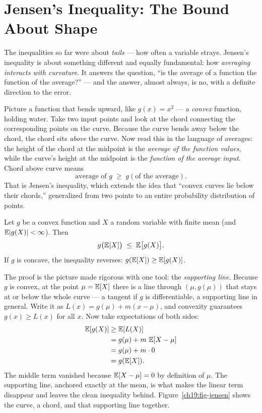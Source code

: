 \section{Jensen's Inequality: The Bound About Shape}
\label{ch19:jensen}

The inequalities so far were about \emph{tails} --- how often a variable
strays. Jensen's inequality is about something different and equally
fundamental: how \emph{averaging interacts with curvature}. It answers the
question, ``is the average of a function the function of the average?'' ---
and the answer, almost always, is no, with a definite direction to the error.

\begin{intuitionbox}
Picture a function that bends upward, like $g(x) = x^2$ --- a \emph{convex}
function, holding water. Take two input points and look at the chord
connecting the corresponding points on the curve. Because the curve bends away
below the chord, the chord sits \emph{above} the curve. Now read this in the
language of averages: the height of the chord at the midpoint is the
\emph{average of the function values}, while the curve's height at the midpoint
is the \emph{function of the average input}. Chord above curve means
\[
  \text{average of } g \;\ge\; g(\text{of the average}).
\]
That is Jensen's inequality, which extends the idea that ``convex curves lie
below their chords,'' generalized from two points to an entire probability
distribution of points.
\end{intuitionbox}

\begin{theorem}
\label{ch19:jensen-thm}
Let $g$ be a convex function and $X$ a random variable with finite mean (and $\operatorname{\mathbb{E}}\lvert g(X)\rvert < \infty$). Then
\[
  g\bigl(\operatorname{\mathbb{E}}[X]\bigr) \;\le\; \operatorname{\mathbb{E}}\bigl[g(X)\bigr].
\]
If $g$ is concave, the inequality reverses:
$g(\operatorname{\mathbb{E}}[X]) \ge \operatorname{\mathbb{E}}[g(X)]$.
\end{theorem}

\begin{whybox}
The proof is the picture made rigorous with one tool: the \emph{supporting
line}. Because $g$ is convex, at the point $\mu = \operatorname{\mathbb{E}}[X]$ there is a line
through $(\mu, g(\mu))$ that stays at or below the whole curve --- a tangent if
$g$ is differentiable, a supporting line in general. Write it as
$L(x) = g(\mu) + m(x - \mu)$, and convexity guarantees $g(x) \ge L(x)$ for all
$x$. Now take expectations of both sides:
\begin{align*}
  \operatorname{\mathbb{E}}[g(X)] &\ge \operatorname{\mathbb{E}}[L(X)] \\
  &= g(\mu) + m\,\operatorname{\mathbb{E}}[X - \mu] \\
  &= g(\mu) + m\cdot 0 \\
  &= g(\operatorname{\mathbb{E}}[X]).
\end{align*}
The middle term vanished because $\operatorname{\mathbb{E}}[X-\mu] = 0$ by definition of $\mu$. The
supporting line, anchored exactly at the mean, is what makes the linear term
disappear and leaves the clean inequality behind.
Figure~\ref{ch19:fig-jensen} shows the curve, a chord, and that supporting line
together.
\end{whybox}

